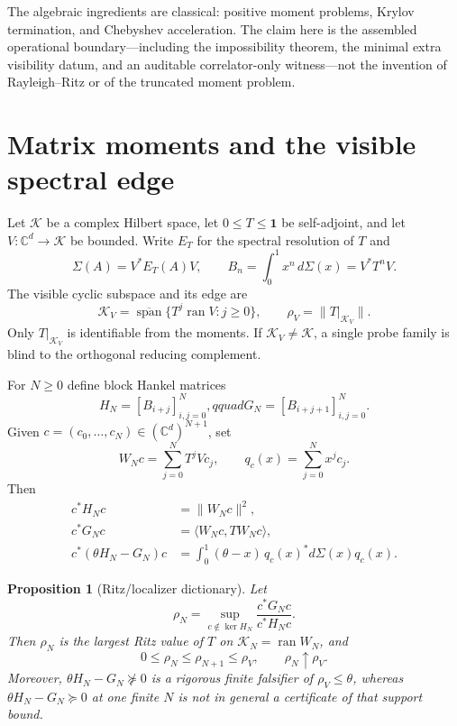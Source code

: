 \documentclass[11pt]{article}
\newtheorem{proposition}[theorem]{Proposition}
\theoremstyle{definition}
\theoremstyle{remark}
\newcommand{\C}{\mathbb C}
\newcommand{\K}{\mathcal K}
\newcommand{\ran}{\operatorname{ran}}
\newcommand{\Id}{\mathbf 1}
\begin{document}
The algebraic ingredients are classical: positive moment problems,
Krylov termination, and Chebyshev acceleration.  The claim here is the
assembled operational boundary---including the impossibility theorem, the
minimal extra visibility datum, and an auditable correlator-only witness---not
the invention of Rayleigh--Ritz or of the truncated moment problem.

\section{Matrix moments and the visible spectral edge}

Let $\K$ be a complex Hilbert space, let $0\leq T\leq\Id$ be self-adjoint, and
let $V:\C^d\to\K$ be bounded.  Write $E_T$ for the spectral resolution of $T$
and
\begin{equation}
  \Sigma(A)=V^*E_T(A)V,
  \qquad B_n=\int_0^1 x^n\,d\Sigma(x)=V^*T^nV.       \label{eq:matrixmeasure}
\end{equation}
The visible cyclic subspace and its edge are
\begin{equation}
 \K_V=\overline{\operatorname{span}}\{T^j\ran V:j\geq0\},
 \qquad \rho_V=\|T|_{\K_V}\|.                       \label{eq:visibleedge}
\end{equation}
Only $T|_{\K_V}$ is identifiable from the moments.  If $\K_V\neq\K$, a
single probe family is blind to the orthogonal reducing complement.

For $N\geq0$ define block Hankel matrices
\begin{equation}
 H_N=[B_{i+j}]_{i,j=0}^N,qquad
 G_N=[B_{i+j+1}]_{i,j=0}^N.                          \label{eq:pencil}
\end{equation}
Given $c=(c_0,\ldots,c_N)\in(\C^d)^{N+1}$, set
\begin{equation}
 W_Nc=\sum_{j=0}^N T^jVc_j,
 \qquad q_c(x)=\sum_{j=0}^N x^jc_j.                  \label{eq:krylovmap}
\end{equation}
Then
\begin{align}
 c^*H_Nc&=\|W_Nc\|^2,\nonumber\\
 c^*G_Nc&=\langle W_Nc,TW_Nc\rangle,\nonumber\\
 c^*(\theta H_N-G_N)c
 &=\int_0^1(\theta-x)\,q_c(x)^*d\Sigma(x)q_c(x).     \label{eq:localizeridentity}
\end{align}

\begin{proposition}[Ritz/localizer dictionary]          \label{prop:ritz}
Let
\begin{equation}
 \rho_N=\sup_{c\notin\ker H_N}\frac{c^*G_Nc}{c^*H_Nc}.
\end{equation}
Then $\rho_N$ is the largest Ritz value of $T$ on
$\K_N=\ran W_N$, and
\begin{equation}
 0\leq\rho_N\leq\rho_{N+1}\leq\rho_V,
 \qquad \rho_N\uparrow\rho_V.                       \label{eq:ritzmonotone}
\end{equation}
Moreover, $\theta H_N-G_N\not\succeq0$ is a rigorous finite
falsifier of $\rho_V\leq\theta$, whereas
$\theta H_N-G_N\succeq0$ at one finite $N$ is not in general a certificate of
that support bound.
\end{proposition}
\end{document}
